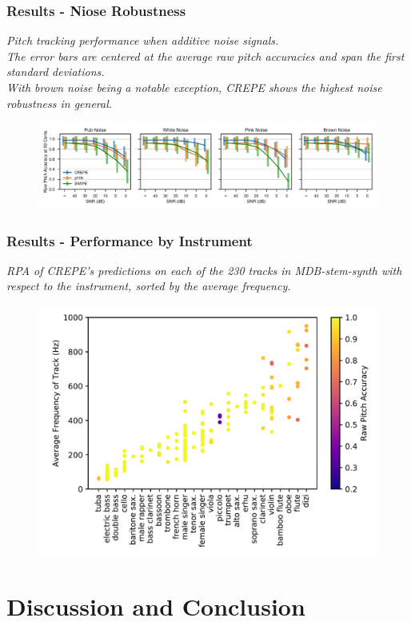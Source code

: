 \documentclass{beamer}
\begin{document}
\begin{frame}
\frametitle{Results - Niose Robustness}
\textit{Pitch tracking performance when additive noise signals. \\
The error bars are centered at the average raw pitch accuracies and span the first standard deviations. \\
With brown noise being a notable exception, CREPE shows the highest noise robustness in general.} 
\begin{figure}
\includegraphics[width=\linewidth]{Image/Robustness.png}
\end{figure}
\end{frame}
\begin{frame}
\frametitle{Results - Performance by Instrument}
\textit{RPA of CREPE’s predictions on each of the 230 tracks in MDB-stem-synth with respect to the instrument, sorted by the average frequency.} 
\begin{figure}
\includegraphics[width=0.83\linewidth]{Image/Instruments.png}
\end{figure}
\end{frame}

\section{Discussion and Conclusion}
\end{document}
